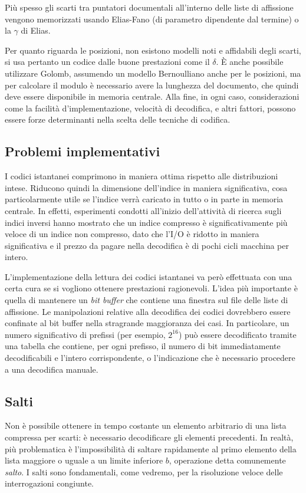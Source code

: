 Più spesso gli scarti tra puntatori documentali all'interno delle liste di affissione vengono memorizzati usando Elias-Fano (di parametro dipendente dal termine) o la $\gamma$ di Elias.

Per quanto riguarda le posizioni, non esistono modelli noti e affidabili degli scarti, si usa pertanto un codice dalle buone prestazioni come il $\delta$. È anche possibile utilizzare Golomb, assumendo un modello Bernoulliano anche per le posizioni, ma per calcolare il modulo è necessario avere la lunghezza del documento, che quindi deve essere disponibile in memoria centrale. Alla fine, in ogni caso, considerazioni come la facilità d'implementazione, velocità di decodifica, e altri fattori, possono essere forze determinanti nella scelta delle tecniche di codifica.
\subsection{Problemi implementativi}
I codici istantanei comprimono in maniera ottima rispetto alle distribuzioni intese. Riducono quindi la dimensione dell'indice in maniera significativa, cosa particolarmente utile se l'indice verrà caricato in tutto o in parte in memoria centrale. In effetti, esperimenti condotti all'inizio dell'attività di ricerca sugli indici inversi hanno mostrato che un indice compresso è significativamente più veloce di un indice non compresso, dato che l'I/O è ridotto in maniera significativa e il prezzo da pagare nella decodifica è di pochi cicli macchina per intero.

L'implementazione della lettura dei codici istantanei va però effettuata con una certa cura se si vogliono ottenere prestazioni ragionevoli. L'idea più importante è quella di mantenere un \textit{bit buffer} che contiene una finestra sul file delle liste di affissione. Le manipolazioni relative alla decodifica dei codici dovrebbero essere confinate al bit buffer nella stragrande maggioranza dei casi. In particolare, un numero significativo di prefissi (per esempio, $2^{16}$) può essere decodificato tramite una tabella che contiene, per ogni prefisso, il numero di bit immediatamente decodificabili e l'intero corrispondente, o l'indicazione che è necessario procedere a una decodifica manuale.
\subsection{Salti}
Non è possibile ottenere in tempo costante un elemento arbitrario di una lista compressa per scarti: è necessario decodificare gli elementi precedenti. In realtà, più problematica è l'impossibilità di saltare rapidamente al primo elemento della lista maggiore o uguale a un limite inferiore $b$, operazione detta comunemente \textit{salto}. I salti sono fondamentali, come vedremo, per la risoluzione veloce delle interrogazioni congiunte.

